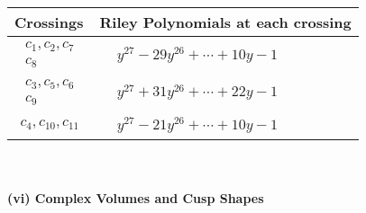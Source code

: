 \documentclass[1p]{elsarticle_modified}
\theoremstyle{definition}
\begin{document}
\begin{tabular}{m{50pt}|m{274pt}}
Crossings & \hspace{64pt}Riley Polynomials at each crossing \\
\hline $$\begin{aligned}c_{1},c_{2},c_{7}\\c_{8}\end{aligned}$$&$\begin{aligned}
&y^{27}-29 y^{26}+\cdots+10 y-1
\end{aligned}$\\
\hline $$\begin{aligned}c_{3},c_{5},c_{6}\\c_{9}\end{aligned}$$&$\begin{aligned}
&y^{27}+31 y^{26}+\cdots+22 y-1
\end{aligned}$\\
\hline $$\begin{aligned}c_{4},c_{10},c_{11}\end{aligned}$$&$\begin{aligned}
&y^{27}-21 y^{26}+\cdots+10 y-1
\end{aligned}$\\
\hline
\end{tabular}\\~\\
\newpage\flushleft \textbf{(vi) Complex Volumes and Cusp Shapes}
\end{document}

